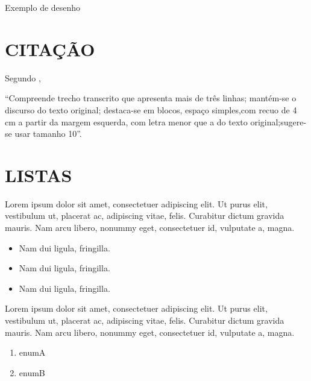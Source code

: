\begin{desenho}[!htpb]
 \centering
	\caption{Exemplo de desenho}
	\label{des:grafico9}
\end{desenho}
\cleardoublepage

\section{CITAÇÃO}

Segundo  ,
\begin{citacao}
``Compreende trecho transcrito que apresenta mais de três linhas; mantém-se o discurso do texto original; destaca-se em blocos, espaço simples,com recuo de 4 cm a partir da margem esquerda, com letra menor que a do texto original;sugere-se usar tamanho 10''.
\end{citacao}

\section {LISTAS}
 Lorem ipsum dolor sit amet, consectetuer adipiscing elit. Ut purus elit, vestibulum ut, placerat ac, adipiscing vitae, felis. Curabitur dictum gravida mauris. Nam arcu libero, nonummy eget, consectetuer id, vulputate a, magna.

\begin{itemize}
\item Nam dui ligula, fringilla.
\item Nam dui ligula, fringilla.
\item Nam dui ligula, fringilla.
\end{itemize}

Lorem ipsum dolor sit amet, consectetuer adipiscing elit. Ut purus elit, vestibulum ut, placerat ac, adipiscing vitae, felis. Curabitur dictum gravida mauris. Nam arcu libero, nonummy eget, consectetuer id, vulputate a, magna.

\begin{enumerate}
 \item enumA
 \item enumB
\end{enumerate}

